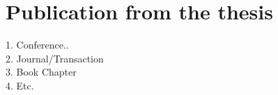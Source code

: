 \chapter{Publication from the thesis}

1. Conference..\\
2. Journal/Transaction\\
3. Book Chapter\\
4. Etc.
